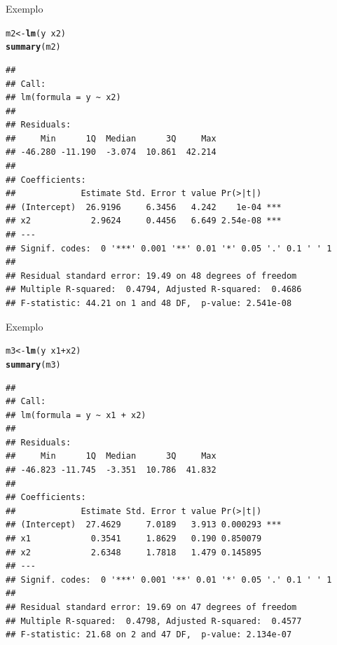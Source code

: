 \documentclass{beamer}\usepackage[]{graphicx}\usepackage[]{color}
\makeatletter
\newcommand{\hlopt}[1]{\textcolor[rgb]{0,0,0}{#1}}%
\newcommand{\hlstd}[1]{\textcolor[rgb]{0.345,0.345,0.345}{#1}}%
\newcommand{\hlkwb}[1]{\textcolor[rgb]{0.69,0.353,0.396}{#1}}%
\newcommand{\hlkwd}[1]{\textcolor[rgb]{0.737,0.353,0.396}{\textbf{#1}}}%
\newenvironment{kframe}{%
 \def\at@end@of@kframe{}%
 \ifinner\ifhmode%
  \def\at@end@of@kframe{\end{minipage}}%
  \begin{minipage}{\columnwidth}%
 \fi\fi%
 \def\FrameCommand##1{\hskip\@totalleftmargin \hskip-\fboxsep
 \colorbox{shadecolor}{##1}\hskip-\fboxsep
     \hskip-\linewidth \hskip-\@totalleftmargin \hskip\columnwidth}%
 \MakeFramed {\advance\hsize-\width
   \@totalleftmargin\z@ \linewidth\hsize
   \@setminipage}}%
 {\par\unskip\endMakeFramed%
 \at@end@of@kframe}
\newenvironment{knitrout}{}{} %
\renewenvironment{knitrout}{\setlength{\topsep}{0mm}}{}
\makeatother
\begin{document}
\begin{frame}[fragile]{Exemplo}

\begin{knitrout}\tiny
{}\color{fgcolor}\begin{kframe}
\begin{alltt}
\hlstd{m2} \hlkwb{<-} \hlkwd{lm}\hlstd{(y} \hlopt{~} \hlstd{x2)}
\hlkwd{summary}\hlstd{(m2)}
\end{alltt}
\begin{verbatim}
## 
## Call:
## lm(formula = y ~ x2)
## 
## Residuals:
##     Min      1Q  Median      3Q     Max 
## -46.280 -11.190  -3.074  10.861  42.214 
## 
## Coefficients:
##             Estimate Std. Error t value Pr(>|t|)    
## (Intercept)  26.9196     6.3456   4.242    1e-04 ***
## x2            2.9624     0.4456   6.649 2.54e-08 ***
## ---
## Signif. codes:  0 '***' 0.001 '**' 0.01 '*' 0.05 '.' 0.1 ' ' 1
## 
## Residual standard error: 19.49 on 48 degrees of freedom
## Multiple R-squared:  0.4794,	Adjusted R-squared:  0.4686 
## F-statistic: 44.21 on 1 and 48 DF,  p-value: 2.541e-08
\end{verbatim}
\end{kframe}
\end{knitrout}


\end{frame}

\begin{frame}[fragile]{Exemplo}

\begin{knitrout}\tiny
{}\color{fgcolor}\begin{kframe}
\begin{alltt}
\hlstd{m3} \hlkwb{<-} \hlkwd{lm}\hlstd{(y} \hlopt{~} \hlstd{x1} \hlopt{+} \hlstd{x2)}
\hlkwd{summary}\hlstd{(m3)}
\end{alltt}
\begin{verbatim}
## 
## Call:
## lm(formula = y ~ x1 + x2)
## 
## Residuals:
##     Min      1Q  Median      3Q     Max 
## -46.823 -11.745  -3.351  10.786  41.832 
## 
## Coefficients:
##             Estimate Std. Error t value Pr(>|t|)    
## (Intercept)  27.4629     7.0189   3.913 0.000293 ***
## x1            0.3541     1.8629   0.190 0.850079    
## x2            2.6348     1.7818   1.479 0.145895    
## ---
## Signif. codes:  0 '***' 0.001 '**' 0.01 '*' 0.05 '.' 0.1 ' ' 1
## 
## Residual standard error: 19.69 on 47 degrees of freedom
## Multiple R-squared:  0.4798,	Adjusted R-squared:  0.4577 
## F-statistic: 21.68 on 2 and 47 DF,  p-value: 2.134e-07
\end{verbatim}
\end{kframe}
\end{knitrout}


\end{frame}
\end{document}
